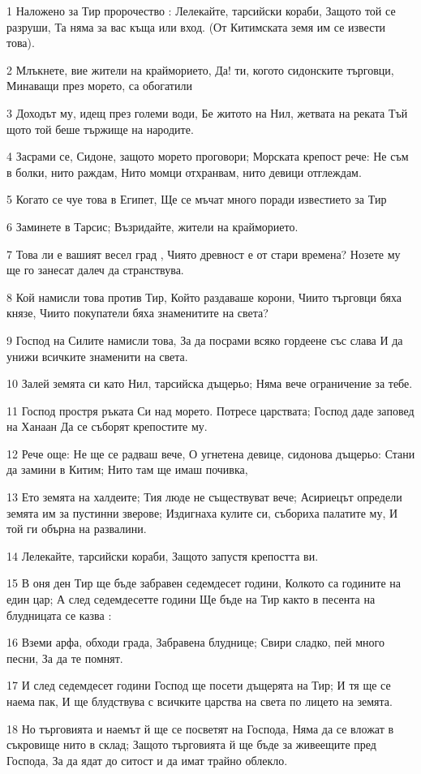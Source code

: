\par 1 Наложено за Тир пророчество : Лелекайте, тарсийски кораби, Защото той се разруши, Та няма за вас къща или вход. (От Китимската земя им се извести това).
\par 2 Млъкнете, вие жители на крайморието, Да! ти, когото сидонските търговци, Минаващи през морето, са обогатили
\par 3 Доходът му, идещ през големи води, Бе житото на Нил, жетвата на реката Тъй щото той беше тържище на народите.
\par 4 Засрами се, Сидоне, защото морето проговори; Морската крепост рече: Не съм в болки, нито раждам, Нито момци отхранвам, нито девици отглеждам.
\par 5 Когато се чуе това в Египет, Ще се мъчат много поради известието за Тир
\par 6 Заминете в Тарсис; Възридайте, жители на крайморието.
\par 7 Това ли е вашият весел град , Чиято древност е от стари времена? Нозете му ще го занесат далеч да странствува.
\par 8 Кой намисли това против Тир, Който раздаваше корони, Чиито търговци бяха князе, Чиито покупатели бяха знаменитите на света?
\par 9 Господ на Силите намисли това, За да посрами всяко гордеене със слава И да унижи всичките знаменити на света.
\par 10 Залей земята си като Нил, тарсийска дъщерьо; Няма вече ограничение за тебе.
\par 11 Господ простря ръката Си над морето. Потресе царствата; Господ даде заповед на Ханаан Да се съборят крепостите му.
\par 12 Рече още: Не ще се радваш вече, О угнетена девице, сидонова дъщерьо: Стани да замини в Китим; Нито там ще имаш почивка,
\par 13 Ето земята на халдеите; Тия люде не съществуват вече; Асириецът определи земята им за пустинни зверове; Издигнаха кулите си, събориха палатите му, И той ги обърна на развалини.
\par 14 Лелекайте, тарсийски кораби, Защото запустя крепостта ви.
\par 15 В оня ден Тир ще бъде забравен седемдесет години, Колкото са годините на един цар; А след седемдесетте години Ще бъде на Тир както в песента на блудницата се казва :
\par 16 Вземи арфа, обходи града, Забравена блуднице; Свири сладко, пей много песни, За да те помнят.
\par 17 И след седемдесет години Господ ще посети дъщерята на Тир; И тя ще се наема пак, И ще блудствува с всичките царства на света по лицето на земята.
\par 18 Но търговията и наемът й ще се посветят на Господа, Няма да се вложат в съкровище нито в склад; Защото търговията й ще бъде за живеещите пред Господа, За да ядат до ситост и да имат трайно облекло.

